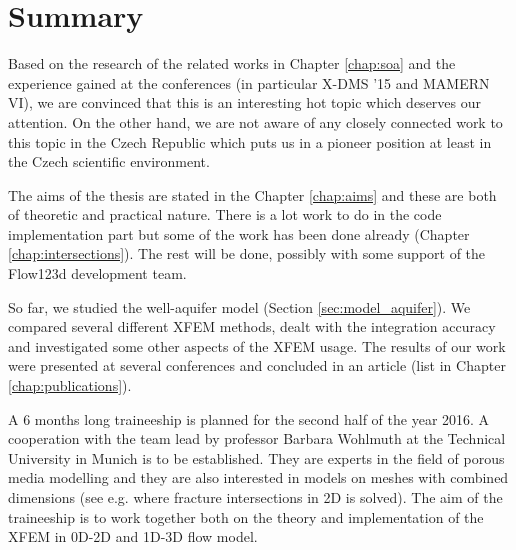 \documentclass[bibliography=totocnumbered,dvipsnames,FM,Dis]{tulthesis_autoreferat}
\begin{document}
\chapter{Summary} \label{chap:summary}

Based on the research of the related works in Chapter \ref{chap:soa} and the experience gained at the conferences
(in particular X-DMS '15 and MAMERN VI), we are convinced that this is an interesting hot topic which deserves
our attention. On the other hand, we are not aware of any closely connected work to this topic in the Czech Republic
which puts us in a pioneer position at least in the Czech scientific environment.

The aims of the thesis are stated in the Chapter \ref{chap:aims} and these are both of theoretic and practical nature.
There is a lot work to do in the code implementation part but some of the work has been done already 
(Chapter \ref{chap:intersections}). The rest will be done, possibly with some support of the Flow123d development team. 

So far, we studied the well-aquifer model (Section \ref{sec:model_aquifer}). We compared several different XFEM methods, 
dealt with the integration accuracy and investigated some other aspects of the XFEM usage. The results
of our work were presented at several conferences and concluded in an article (list in Chapter \ref{chap:publications}).

A 6 months long traineeship is planned for the second half of the year 2016. A cooperation with the team lead
by professor Barbara Wohlmuth at the Technical University in Munich is to be established. They are experts
in the field of porous media modelling and they are also interested in models on meshes with combined dimensions
(see e.g. \cite{schwenck_2015} where fracture intersections in 2D is solved). The aim of the traineeship is to
work together both on the theory and implementation of the XFEM in 0D-2D and 1D-3D flow model.



{\small

% 

}
\end{document}
